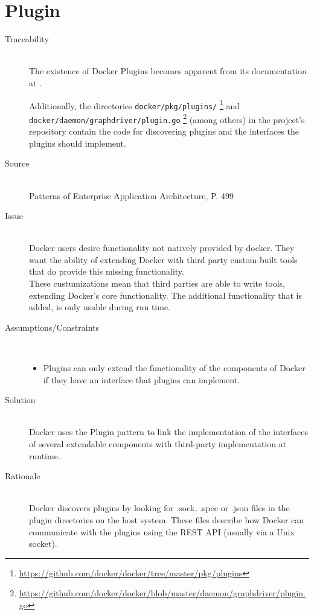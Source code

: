 \section{Plugin}
\label{sec:pattern-plugin}
\begin{description}

\item [Traceability]~\\
The existence of Docker Plugins becomes apparent from its documentation at \cite{dockerplugindocs}.

Additionally, the directories \verb|docker/pkg/plugins/| \footnote{\url{https://github.com/docker/docker/tree/master/pkg/plugins}} and \verb|  docker/daemon/graphdriver/plugin.go| \footnote{\url{https://github.com/docker/docker/blob/master/daemon/graphdriver/plugin.go}} (among others) in the project's repository contain the code for discovering plugins and the interfaces the plugins should implement.

\item [Source]~\\
Patterns of Enterprise Application Architecture, P. 499 \cite{eaa}

\item [Issue]~\\
Docker users desire functionality not natively provided by docker. They want the ability of extending Docker with third party custom-built tools that do provide this missing functionality. \\
These custumizations mean that third parties are able to write tools, extending Docker's core functionality\cite{dockerpluginblog}.
The additional functionality that is added, is only usable during run time.


\item [Assumptions/Constraints]~
\begin{itemize}
\item Plugins can only extend the functionality of the components of Docker if they have an interface that plugins can implement.
\end{itemize}

\item [Solution]~\\
Docker uses the Plugin pattern to link the implementation of the interfaces of several extendable components with third-party implementation at runtime.

\item [Rationale] ~\\ %
Docker discovers plugins by looking for .sock, .spec or .json files in the plugin directories on the host system. These files describe how Docker can communicate with the plugins using the REST API (usually via a Unix socket).


\end{description}
